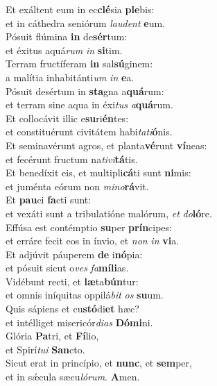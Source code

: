 \evenverse Et exáltent eum in ec\textbf{clé}sia \textbf{ple}bis:~\*\\
\evenverse et in cáthedra seniórum \textit{lau}\textit{dent} \textbf{e}um.\\
\oddverse Pósuit flúmina \textbf{in} de\textbf{sér}tum:~\*\\
\oddverse et éxitus aquá\textit{rum} \textit{in} \textbf{si}tim.\\
\evenverse Terram fructíferam \textbf{in} sal\textbf{sú}ginem:~\*\\
\evenverse a malítia inhabitánti\textit{um} \textit{in} \textbf{e}a.\\
\oddverse Pósuit desértum in \textbf{sta}gna a\textbf{quá}rum:~\*\\
\oddverse et terram sine aqua in éxi\textit{tus} \textit{a}\textbf{quá}rum.\\
\evenverse Et collocávit illic e\textbf{su}ri\textbf{én}tes:~\*\\
\evenverse et constituérunt civitátem habi\textit{ta}\textit{ti}\textbf{ó}nis.\\
\oddverse Et seminavérunt agros, et planta\textbf{vé}runt \textbf{ví}neas:~\*\\
\oddverse et fecérunt fructum na\textit{ti}\textit{vi}\textbf{tá}tis.\\
\evenverse Et benedíxit eis, et multipli\textbf{cá}ti sunt \textbf{ni}mis:~\*\\
\evenverse et juménta eórum non \textit{mi}\textit{no}\textbf{rá}vit.\\
\oddverse Et \textbf{pau}ci \textbf{fa}cti sunt:~\*\\
\oddverse et vexáti sunt a tribulatióne malórum, \textit{et} \textit{do}\textbf{ló}re.\\
\evenverse Effúsa est contémptio \textbf{su}per \textbf{prín}cipes:~\*\\
\evenverse et erráre fecit eos in ínvio, et \textit{non} \textit{in} \textbf{vi}a.\\
\oddverse Et adjúvit páuperem \textbf{de} i\textbf{nó}pia:~\*\\
\oddverse et pósuit sicut o\textit{ves} \textit{fa}\textbf{mí}\textbf{li}as.\\
\evenverse Vidébunt recti, et \textbf{læ}ta\textbf{bún}tur:~\*\\
\evenverse et omnis iníquitas oppilá\textit{bit} \textit{os} \textbf{su}um.\\
\oddverse Quis sápiens et cu\textbf{stó}di\textbf{et} hæc?~\*\\
\oddverse et intélliget misericór\textit{di}\textit{as} \textbf{Dó}\textbf{mi}ni.\\
\evenverse Glória \textbf{Pa}tri, et \textbf{Fí}lio,~\*\\
\evenverse et Spirí\textit{tu}\textit{i} \textbf{San}cto.\\
\oddverse Sicut erat in princípio, et \textbf{nunc}, et \textbf{sem}per,~\*\\
\oddverse et in sǽcula sæcu\textit{ló}\textit{rum}. \textbf{A}men.\\
